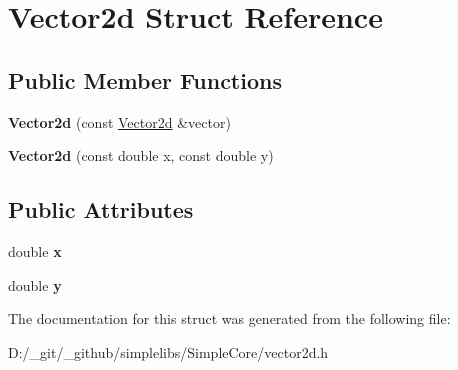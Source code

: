 \hypertarget{struct_vector2d}{}\section{Vector2d Struct Reference}
\label{struct_vector2d}
\subsection*{Public Member Functions}
\begin{DoxyCompactItemize}
\item 
\mbox{\label{struct_vector2d_aba5e7f4b80cfbd84005946a5b2b1b6ab}} 
{\bfseries Vector2d} (const \mbox{\hyperlink{struct_vector2d}{Vector2d}} \&vector)
\item 
\mbox{\label{struct_vector2d_aa7456828fba87c279a117ee4d8745329}} 
{\bfseries Vector2d} (const double x, const double y)
\end{DoxyCompactItemize}
\subsection*{Public Attributes}
\begin{DoxyCompactItemize}
\item 
\mbox{\label{struct_vector2d_a151efa5a874304b46327130770327810}} 
double {\bfseries x}
\item 
\mbox{\label{struct_vector2d_aa61b1cb70cc682e1bbc29a7b2f72681e}} 
double {\bfseries y}
\end{DoxyCompactItemize}


The documentation for this struct was generated from the following file\+:\begin{DoxyCompactItemize}
\item 
D\+:/\+\_\+git/\+\_\+github/simplelibs/\+Simple\+Core/vector2d.\+h\end{DoxyCompactItemize}
